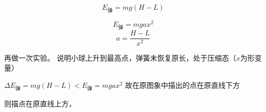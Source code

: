 
\[ E_{\text{弹}}=mg(H-L) \]


\[ E_{\text{弹}}=mgax^2 \]
\[ a=\frac{H-L}{x^2} \]

再做一次实验。 说明小球上升到最高点，弹簧未恢复原长，处于压缩态（$x$为形变量）

$\Delta E_{\text{弹}}=mg(H-L)<E_{\text{弹}}=mgax^2$ 故在原图象中描出的点在原直线下方 %

 则描点在原直线上方，
